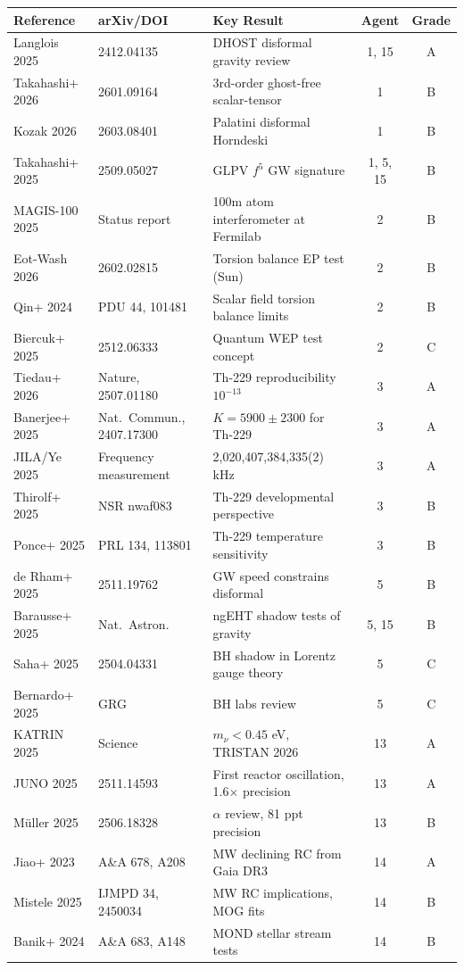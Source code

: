 \documentclass[11pt,a4paper]{article}
\begin{document}
\begin{longtable}{p{3cm}p{3cm}p{5cm}cc}
\toprule
\textbf{Reference} & \textbf{arXiv/DOI} & \textbf{Key Result} & \textbf{Agent} & \textbf{Grade} \\
\midrule
\endhead
Langlois 2025 & 2412.04135 & DHOST disformal gravity review & 1, 15 & A \\
Takahashi+ 2026 & 2601.09164 & 3rd-order ghost-free scalar-tensor & 1 & B \\
Kozak 2026 & 2603.08401 & Palatini disformal Horndeski & 1 & B \\
Takahashi+ 2025 & 2509.05027 & GLPV $f^5$ GW signature & 1, 5, 15 & B \\
MAGIS-100 2025 & Status report & 100m atom interferometer at Fermilab & 2 & B \\
Eot-Wash 2026 & 2602.02815 & Torsion balance EP test (Sun) & 2 & B \\
Qin+ 2024 & PDU 44, 101481 & Scalar field torsion balance limits & 2 & B \\
Biercuk+ 2025 & 2512.06333 & Quantum WEP test concept & 2 & C \\
Tiedau+ 2026 & Nature, 2507.01180 & Th-229 reproducibility $10^{-13}$ & 3 & A \\
Banerjee+ 2025 & Nat.\ Commun., 2407.17300 & $K = 5900\pm2300$ for Th-229 & 3 & A \\
JILA/Ye 2025 & Frequency measurement & 2,020,407,384,335(2) kHz & 3 & A \\
Thirolf+ 2025 & NSR nwaf083 & Th-229 developmental perspective & 3 & B \\
Ponce+ 2025 & PRL 134, 113801 & Th-229 temperature sensitivity & 3 & B \\
de Rham+ 2025 & 2511.19762 & GW speed constrains disformal & 5 & B \\
Barausse+ 2025 & Nat.\ Astron. & ngEHT shadow tests of gravity & 5, 15 & B \\
Saha+ 2025 & 2504.04331 & BH shadow in Lorentz gauge theory & 5 & C \\
Bernardo+ 2025 & GRG & BH labs review & 5 & C \\
KATRIN 2025 & Science & $m_\nu < 0.45$ eV, TRISTAN 2026 & 13 & A \\
JUNO 2025 & 2511.14593 & First reactor oscillation, 1.6$\times$ precision & 13 & A \\
M\"uller 2025 & 2506.18328 & $\alpha$ review, 81 ppt precision & 13 & B \\
Jiao+ 2023 & A\&A 678, A208 & MW declining RC from Gaia DR3 & 14 & A \\
Mistele 2025 & IJMPD 34, 2450034 & MW RC implications, MOG fits & 14 & B \\
Banik+ 2024 & A\&A 683, A148 & MOND stellar stream tests & 14 & B \\
\bottomrule
\end{longtable}
\end{document}
